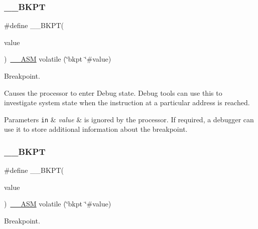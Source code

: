 \subsubsection{\texorpdfstring{\+\_\+\+\_\+\+B\+K\+PT}{\_\_BKPT}\hspace{0.1cm}{\footnotesize\ttfamily [2/3]}}
{\footnotesize\ttfamily \#define \+\_\+\+\_\+\+B\+K\+PT(\begin{DoxyParamCaption}\item[{}]{value }\end{DoxyParamCaption})~\mbox{\hyperlink{cmsis__iccarm_8h_a1378040bcf22428955c6e3ce9c2053cd}{\+\_\+\+\_\+\+A\+SM}} volatile (\char`\"{}bkpt \char`\"{}\#value)}



Breakpoint. 

Causes the processor to enter Debug state. Debug tools can use this to investigate system state when the instruction at a particular address is reached. 
\begin{DoxyParams}[1]{Parameters}
\mbox{\tt in}  & {\em value} & is ignored by the processor. If required, a debugger can use it to store additional information about the breakpoint. \\
\hline
\end{DoxyParams}
\mbox{\label{group___c_m_s_i_s___core___instruction_interface_ga15ea6bd3c507d3e81c3b3a1258e46397}} 
\subsubsection{\texorpdfstring{\+\_\+\+\_\+\+B\+K\+PT}{\_\_BKPT}\hspace{0.1cm}{\footnotesize\ttfamily [3/3]}}
{\footnotesize\ttfamily \#define \+\_\+\+\_\+\+B\+K\+PT(\begin{DoxyParamCaption}\item[{}]{value }\end{DoxyParamCaption})~\mbox{\hyperlink{cmsis__iccarm_8h_a1378040bcf22428955c6e3ce9c2053cd}{\+\_\+\+\_\+\+A\+SM}} volatile (\char`\"{}bkpt \char`\"{}\#value)}



Breakpoint. 

